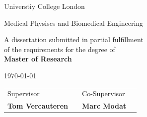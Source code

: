 \documentclass[a4paper,10pt]{book}
\theoremstyle{definition}
\begin{document}
\begin{titlepage}
\begin{center}
	\LARGE{\rm\expandafter{Universtiy College London}}\par
	\expandafter{\Large{Medical Physiscs and Biomedical Engineering}\par}
\end{center}

\vspace{0.5cm}

\begin{center}
	A dissertation submitted in partial fulfillment 
	\\
	of the requirements for the degree of
	\\ 
	{\bf Master of Research}	
\end{center}

\vspace{0.2cm}
\begin{center}
	\today
\end{center}

\vspace{0.5cm}

\begin{center}
\begin{tabular}{l p{3.3cm} l l}
	
	Supervisor& & Co-Supervisor \\
	\textbf{Tom Vercauteren} & & \textbf{Marc Modat}  \\
	
\end{tabular}
\end{center}


\vspace{1 cm}


\par
\vfill\par 

\endgroup


\end{titlepage}



\end{document}
